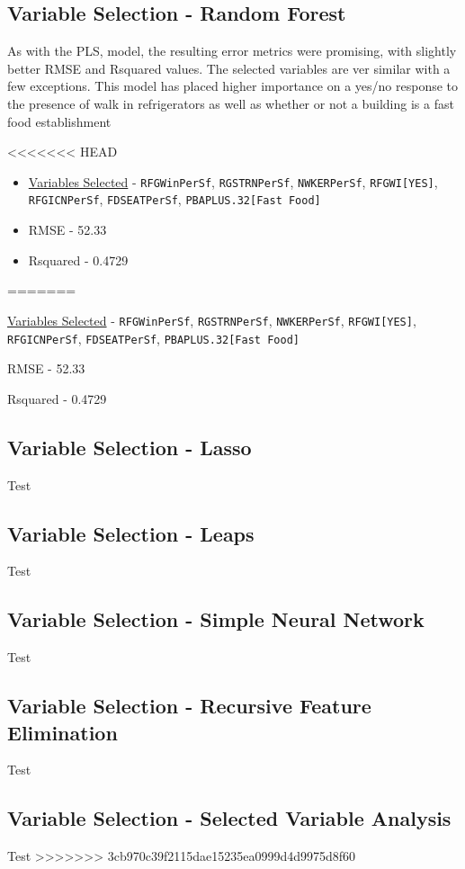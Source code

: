 \subsection{Variable Selection - Random Forest}

As with the PLS, model, the resulting error metrics were promising, with slightly better RMSE and Rsquared values.  The selected variables are ver similar with a few exceptions.  This model has placed higher importance on a yes/no response to the presence of walk in refrigerators as well as whether or not a building is a fast food establishment

<<<<<<< HEAD
\begin{itemize}
\item \hyperref[appendix:electricity:rf]{Variables Selected} - \lstinline{RFGWinPerSf}, \lstinline{RGSTRNPerSf}, \lstinline{NWKERPerSf}, \lstinline{RFGWI[YES]}, \lstinline{RFGICNPerSf}, \lstinline{FDSEATPerSf}, \lstinline{PBAPLUS.32[Fast Food]}
\item RMSE - 52.33
\item Rsquared - 0.4729
\end{itemize}

=======
\begin{myitemize}
\item \hyperref[appendix:electricity:rf]{Variables Selected} - \lstinline{RFGWinPerSf}, \lstinline{RGSTRNPerSf}, \lstinline{NWKERPerSf}, \lstinline{RFGWI[YES]}, \lstinline{RFGICNPerSf}, \lstinline{FDSEATPerSf}, \lstinline{PBAPLUS.32[Fast Food]}
\item RMSE - 52.33
\item Rsquared - 0.4729
\end{myitemize}

\subsection{Variable Selection - Lasso}
Test

\subsection{Variable Selection - Leaps}
Test

\subsection{Variable Selection - Simple Neural Network}
Test

\subsection{Variable Selection - Recursive Feature Elimination}
Test

\subsection{Variable Selection - Selected Variable Analysis}
Test
>>>>>>> 3cb970c39f2115dae15235ea0999d4d9975d8f60
